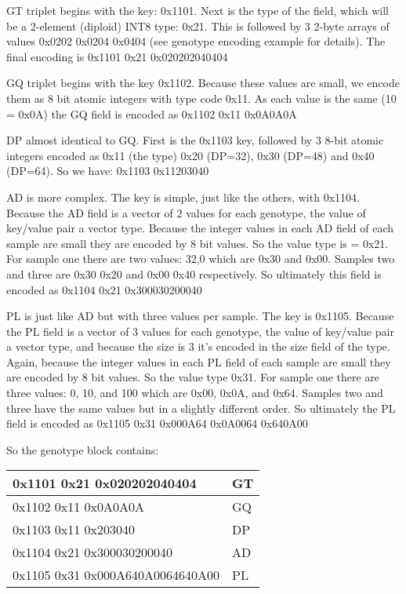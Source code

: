 \documentclass[8pt]{article}
\begin{document}
GT triplet begins with the key: 0x1101.  Next is the type of the field, which will be a 2-element (diploid) INT8 type: 0x21.  This is followed by 3 2-byte arrays of values 0x0202 0x0204 0x0404 (see genotype encoding example for details).  The final encoding is 0x1101 0x21 0x020202040404

GQ triplet begins with the key 0x1102.  Because these values are small, we encode them as 8 bit atomic integers with type code 0x11.  As each value is the same (10 = 0x0A) the GQ field is encoded as 0x1102 0x11 0x0A0A0A

DP almost identical to GQ.  First is the 0x1103 key, followed by 3 8-bit atomic integers encoded as 0x11 (the type) 0x20 (DP=32), 0x30 (DP=48) and 0x40 (DP=64).  So we have: 0x1103 0x11203040

AD is more complex.  The key is simple, just like the others, with 0x1104.  Because the AD field is a vector of 2 values for each genotype, the value of key/value pair a vector type.  Because the integer values in each AD field of each sample are small they are encoded by 8 bit values.  So the value type is = 0x21.  For sample one there are two values: 32,0 which are 0x30 and 0x00.  Samples two and three are 0x30 0x20 and 0x00 0x40 respectively.  So ultimately this field is encoded as 0x1104 0x21 0x300030200040

PL is just like AD but with three values per sample.  The key is 0x1105.  Because the PL field is a vector of 3 values for each genotype, the value of key/value pair a vector type, and because the size is 3 it's encoded in the size field of the type.  Again, because the integer values in each PL field of each sample are small they are encoded by 8 bit values.  So the value type 0x31.  For sample one there are three values: 0, 10, and 100 which are 0x00, 0x0A, and 0x64.  Samples two and three have the same values but in a slightly different order.  So ultimately the PL field is encoded as 0x1105 0x31 0x000A64 0x0A0064 0x640A00

So the genotype block contains:

\vspace{0.3cm}
\begin{tabular}{|l| l|} \hline
0x1101 0x21 0x020202040404 & GT \\ \hline
0x1102 0x11 0x0A0A0A & GQ \\ \hline
0x1103 0x11 0x203040 & DP \\ \hline
0x1104 0x21 0x300030200040 & AD \\ \hline
0x1105 0x31 0x000A640A0064640A00 & PL \\ \hline
\end{tabular}
\vspace{0.3cm}
\end{document}
